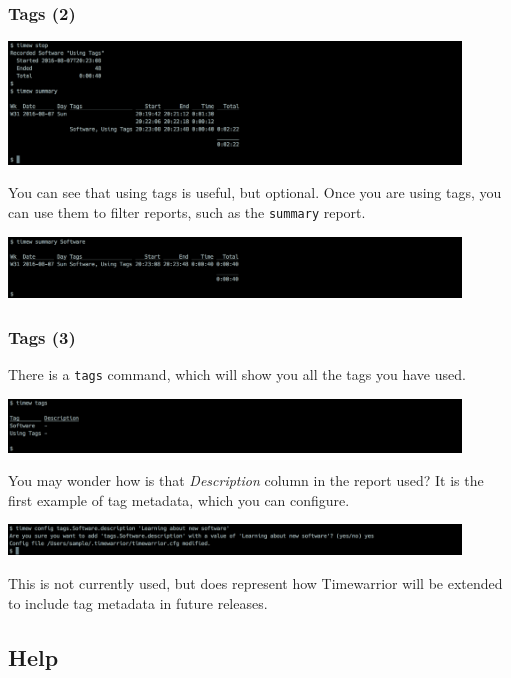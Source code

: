 \documentclass[t,handout]{beamer}
\begin{document}
\begin{frame}[fragile]\frametitle{Tags (2)}
    \includegraphics[width=12cm]{images/tutorial9.png}

    You can see that using tags is useful, but optional. Once you are using tags, you can use them to filter reports, such as the \verb=summary= report.

    \includegraphics[width=12cm]{images/tutorial10.png}
\end{frame}

\begin{frame}[fragile]\frametitle{Tags (3)}
    There is a \verb=tags= command, which will show you all the tags you have used.

    \includegraphics[width=12cm]{images/tutorial11.png}

    You may wonder how is that \textit{Description} column in the report used? It is the first example of tag metadata, which you can configure.

    \includegraphics[width=12cm]{images/tutorial12.png}

    This is not currently used, but does represent how Timewarrior will be extended to include tag metadata in future releases.
\end{frame}

\subsection{Help}
\end{document}
